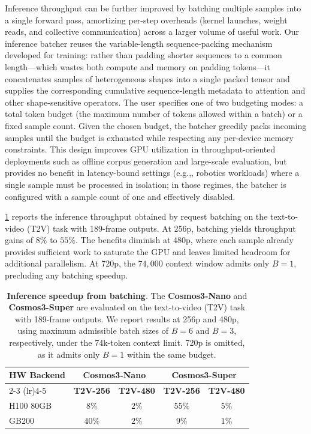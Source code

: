 \documentclass{llmxive}
\providecommand{\eg}{e.g.,\xspace}
\begin{document}
Inference throughput can be further improved by batching multiple samples into a single forward pass, amortizing per-step overheads (kernel launches, weight reads, and collective communication) across a larger volume of useful work. Our inference batcher reuses the variable-length sequence-packing mechanism developed for training: rather than padding shorter sequences to a common length---which wastes both compute and memory on padding tokens---it concatenates samples of heterogeneous shapes into a single packed tensor and supplies the corresponding cumulative sequence-length metadata to attention and other shape-sensitive operators. The user specifies one of two budgeting modes: a total token budget (the maximum number of tokens allowed within a batch) or a fixed sample count. Given the chosen budget, the batcher greedily packs incoming samples until the budget is exhausted while respecting any per-device memory constraints. This design improves GPU utilization in throughput-oriented deployments such as offline corpus generation and large-scale evaluation, but provides no benefit in latency-bound settings (\eg, robotics workloads) where a single sample must be processed in isolation; in those regimes, the batcher is configured with a sample count of one and effectively disabled.

\cref{tab:cosmos3_batching} reports the inference throughput obtained by request batching on the text-to-video (T2V) task with 189-frame outputs. At 256p, batching yields throughput gains of $8\%$ to $55\%$. The benefits diminish at 480p, where each sample already provides sufficient work to saturate the GPU and leaves limited headroom for additional parallelism. At 720p, the $74{,}000$ context window admits only $B{=}1$, precluding any batching speedup.

\begin{table}[t]
    \centering
    \setlength{\tabcolsep}{4pt}
    \small
    \begin{tabular}{l|cc|cc}
        \toprule
        \textbf{HW Backend} &
        \multicolumn{2}{c|}{\textbf{Cosmos3-Nano}} &
        \multicolumn{2}{c}{\textbf{Cosmos3-Super}} \\
        \cmidrule(lr){2-3}
        \cmidrule(lr){4-5}
        &
        \textbf{T2V-256} & \textbf{T2V-480} &
        \textbf{T2V-256} & \textbf{T2V-480} \\
        \midrule
        H100 80GB &
        $8\%$ & $2\%$ &
        $55\%$ & $5\%$ \\
        GB200 &
        $40\%$ & $2\%$ &
        $9\%$ & $1\%$ \\
        \bottomrule
    \end{tabular}
\caption{
    \textbf{Inference speedup from batching}. The \textbf{Cosmos3-Nano} and \textbf{Cosmos3-Super} are evaluated on the text-to-video (T2V) task with 189-frame outputs. We report results at 256p and 480p, using maximum admissible batch sizes of $B=6$ and $B=3$, respectively, under the 74k-token context limit. 720p is omitted, as it admits only $B=1$ within the same budget.}
\label{tab:cosmos3_batching}
\end{table}
\end{document}
